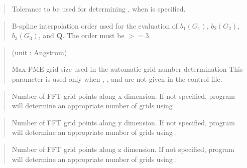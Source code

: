 \documentclass[a4paper,11pt,oneside,english]{sphinxmanual}
\begin{document}
 
\begin{quote}


Tolerance to be used for determining , when  is specified.
\end{quote}

 
\begin{quote}


B-spline interpolation order used for the evaluation of \(b_1 (G_1)\),
\(b_2 (G_2)\), \(b_3 (G_3)\), and \(\mathbf{Q}\).
The order must be \(>= 3\).
\end{quote}

 
\begin{quote}

 (unit : Angstrom)

Max PME grid size used in the automatic grid number determination
This parameter is used only when , ,
and  are not given in the control file.
\end{quote}

 
\begin{quote}


Number of FFT grid points along x dimension.
If not specified, program will determine an appropriate number of grids
using .
\end{quote}

 
\begin{quote}


Number of FFT grid points along y dimension.
If not specified, program will determine an appropriate number of grids
using .
\end{quote}

 
\begin{quote}


Number of FFT grid points along z dimension.
If not specified, program will determine an appropriate number of grids
using .
\end{quote}
\end{document}
